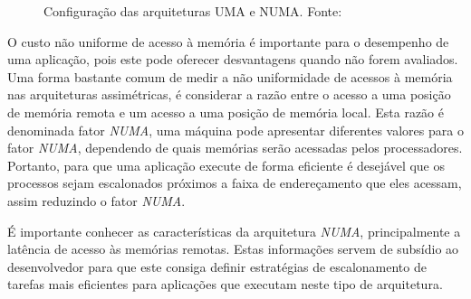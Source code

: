 \documentclass[ti]{texufpel}
\begin{document}
\begin{figure}[!htp]
\centering
{}
\caption{Configuração das arquiteturas UMA e NUMA. Fonte:~\cite{rodolfo14}}
\label{arquiteturas_config}
\end{figure}

O custo não uniforme de acesso à memória é importante para o desempenho de uma aplicação, pois este pode oferecer desvantagens quando não forem avaliados. Uma forma bastante comum de medir a não uniformidade de acessos à memória nas arquiteturas assimétricas, é considerar a razão entre o acesso a uma posição de memória remota e um acesso a uma posição de memória local. Esta razão é denominada fator \emph{NUMA}, uma máquina pode apresentar diferentes valores para o fator \emph{NUMA}, dependendo de quais memórias serão acessadas pelos processadores. Portanto, para que uma aplicação execute de forma eficiente é desejável que os processos sejam escalonados próximos a faixa de endereçamento que eles acessam, assim reduzindo o fator \emph{NUMA}.

É importante conhecer as características da arquitetura \emph{NUMA}, principalmente a latência de acesso às memórias remotas. Estas informações servem de subsídio ao desenvolvedor para que este consiga definir estratégias de escalonamento de tarefas mais eficientes para aplicações que executam neste tipo de arquitetura.
\end{document}
